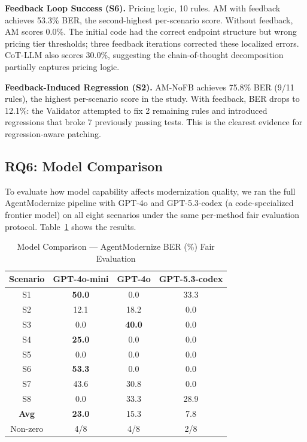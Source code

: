 \documentclass[conference]{IEEEtran}
\begin{document}
\textbf{Feedback Loop Success (S6).} Pricing logic, 10 rules. AM with feedback achieves 53.3\% BER, the second-highest per-scenario score. Without feedback, AM scores 0.0\%. The initial code had the correct endpoint structure but wrong pricing tier thresholds; three feedback iterations corrected these localized errors. CoT-LLM also scores 30.0\%, suggesting the chain-of-thought decomposition partially captures pricing logic.

\textbf{Feedback-Induced Regression (S2).} AM-NoFB achieves 75.8\% BER (9/11 rules), the highest per-scenario score in the study. With feedback, BER drops to 12.1\%: the Validator attempted to fix 2 remaining rules and introduced regressions that broke 7 previously passing tests. This is the clearest evidence for regression-aware patching.

\subsection{RQ6: Model Comparison}
\label{sec:model-comparison}

To evaluate how model capability affects modernization quality, we ran the full AgentModernize pipeline with GPT-4o and GPT-5.3-codex (a code-specialized frontier model) on all eight scenarios under the same per-method fair evaluation protocol. Table~\ref{tab:rq6} shows the results.

\begin{table}[htbp]
\caption{Model Comparison --- AgentModernize BER (\%) Fair Evaluation}
\label{tab:rq6}
\centering
\footnotesize
\begin{tabular}{@{}cccc@{}}
\toprule
\textbf{Scenario} & \textbf{GPT-4o-mini} & \textbf{GPT-4o} & \textbf{GPT-5.3-codex} \\
\midrule
S1 & \textbf{50.0} & 0.0 & 33.3 \\
S2 & 12.1 & 18.2 & 0.0 \\
S3 & 0.0 & \textbf{40.0} & 0.0 \\
S4 & \textbf{25.0} & 0.0 & 0.0 \\
S5 & 0.0 & 0.0 & 0.0 \\
S6 & \textbf{53.3} & 0.0 & 0.0 \\
S7 & 43.6 & 30.8 & 0.0 \\
S8 & 0.0 & 33.3 & 28.9 \\
\midrule
\textbf{Avg} & \textbf{23.0} & 15.3 & 7.8 \\
Non-zero & 4/8 & 4/8 & 2/8 \\
\bottomrule
\end{tabular}
\end{table}
\end{document}
